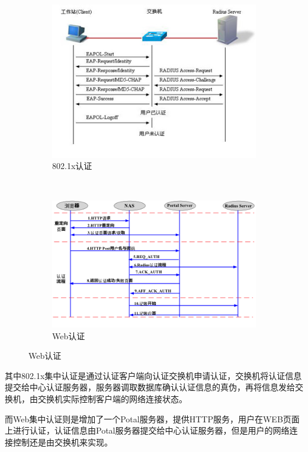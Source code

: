 \documentclass{itecreport-zh}
\begin{document}
\begin{figure}[!h]
\centering
  \begin{subfigure}[b]{0.3\textwidth}
  \includegraphics[width=\textwidth]{8021x.png}
  \caption{802.1x认证}
  \end{subfigure}
  ~
  \begin{subfigure}[b]{0.3\textwidth}
  \includegraphics[width=\textwidth]{web.png}
  \caption{Web认证}
  \end{subfigure}
\end{figure}

其中802.1x集中认证是通过认证客户端向认证交换机申请认证，交换机将认证信息提交给中心认证服务器，服务器调取数据库确认认证信息的真伪，再将信息发给交换机，由交换机实际控制客户端的网络连接状态。

而Web集中认证则是增加了一个Potal服务器，提供HTTP服务，用户在WEB页面上进行认证，认证信息由Potal服务器提交给中心认证服务器，但是用户的网络连接控制还是由交换机来实现。
\end{document}
